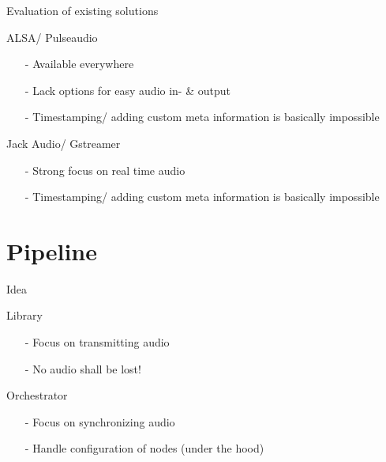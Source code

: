 \documentclass{beamer}
\begin{document}
	
	\begin{frame}{Evaluation of existing solutions}
		\begin{alertblock}{ALSA/ Pulseaudio}
			\begin{itemize}
				\item[-] Available everywhere
				\item[-] Lack options for easy audio in- \& output
				\item[-] Timestamping/ adding custom meta information is basically impossible
			\end{itemize}
		\end{alertblock}
		\pause
		\begin{alertblock}{Jack Audio/ Gstreamer}
			\begin{itemize}
				\item[-] Strong focus on real time audio
				\item[-] Timestamping/ adding custom meta information is basically impossible
			\end{itemize}
		\end{alertblock}
	\end{frame}
	
	
	
	
	
	

	\section{Pipeline}
	
	\begin{frame}{Idea}
		\begin{alertblock}{Library}
			\begin{itemize}
				\item[-] Focus on transmitting audio
				\item[-] No audio shall be lost!
			\end{itemize}
		\end{alertblock}
		\pause
		\begin{alertblock}{Orchestrator}
			\begin{itemize}
				\item[-] Focus on synchronizing audio
				\item[-] Handle configuration of nodes (under the hood)
			\end{itemize}
		\end{alertblock}	
	\end{frame}
	
\end{document}
